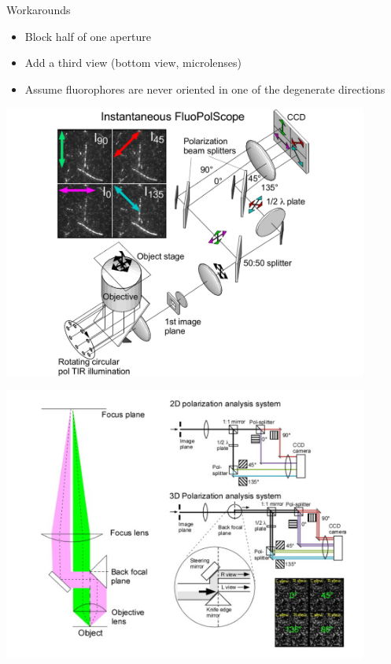 \documentclass[presentation]{beamer}
\begin{document}
\begin{frame}[label=sec-5]{Workarounds}
\begin{itemize}
\item Block half of one aperture
\item Add a third view (bottom view, microlenses)
\item Assume fluorophores are never oriented in one of the degenerate directions
\end{itemize}
\end{frame}
\begin{frame}[label=sec-6]{}
\begin{center}
  \includegraphics[width=0.9\textwidth, interpolate=true]{figs/2dpol}\\
\end{center}
\end{frame}
\begin{frame}[label=sec-7]{}
\begin{center}
  \includegraphics[width=0.9\textwidth, interpolate=true]{figs/3dpol}\\
\end{center}
\end{frame}
\end{document}
